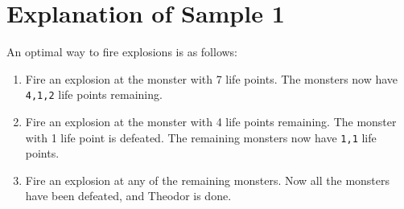 \section*{Explanation of Sample 1}
An optimal way to fire explosions is as follows:  
\begin{enumerate}  
  \item Fire an explosion at the monster with 7 life points. The monsters now have \verb+4,1,2+ life points remaining.  
  \item Fire an explosion at the monster with 4 life points remaining. The monster with 1 life point is defeated. The remaining monsters now have \verb+1,1+ life points.  
  \item Fire an explosion at any of the remaining monsters. Now all the monsters have been defeated, and Theodor is done.  
\end{enumerate}
